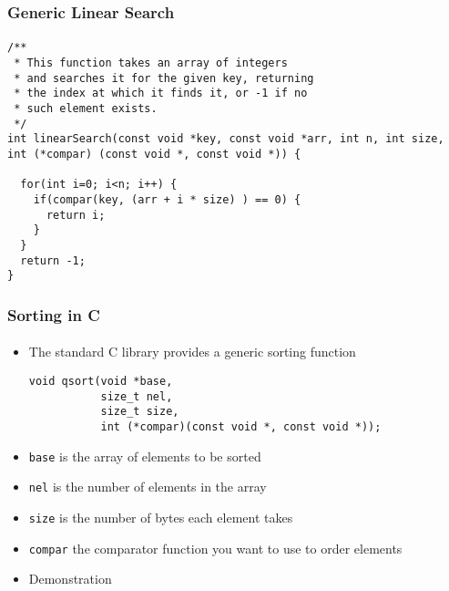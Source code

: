 \documentclass[]{beamer}
\begin{document}
\begin{frame}[fragile]
  \frametitle{Generic Linear Search}
  \framesubtitle{}

\begin{verbatim}
/**
 * This function takes an array of integers
 * and searches it for the given key, returning
 * the index at which it finds it, or -1 if no
 * such element exists.
 */
int linearSearch(const void *key, const void *arr, int n, int size, int (*compar) (const void *, const void *)) {

  for(int i=0; i<n; i++) {
    if(compar(key, (arr + i * size) ) == 0) {
      return i;
    }
  }
  return -1;
}
\end{verbatim}

\end{frame}

\begin{frame}[fragile]
  \frametitle{Sorting in C}
  \framesubtitle{}

\begin{itemize}[<+->]
  \item The standard C library provides a generic sorting function
\begin{verbatim}
void qsort(void *base,
           size_t nel,
           size_t size,
           int (*compar)(const void *, const void *));
\end{verbatim}
  \item \texttt{base} is the array of elements to be sorted 
  \item \texttt{nel} is the number of elements in the array
  \item \texttt{size} is the number of bytes each element takes
  \item \texttt{compar} the comparator function you want to use to order elements
  \item Demonstration
\end{itemize}

\end{frame}
\end{document}
